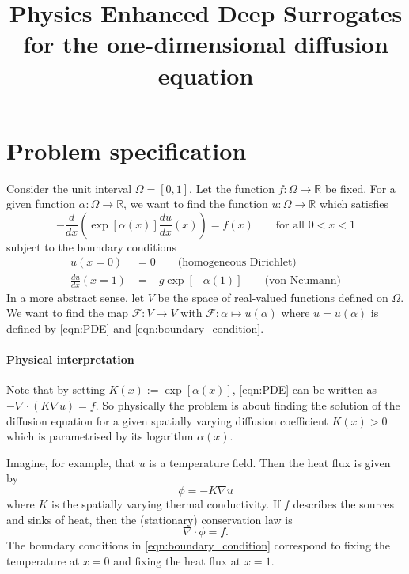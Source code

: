 \documentclass[11pt]{article}
\title{Physics Enhanced Deep Surrogates for the one-dimensional diffusion equation}
\begin{document}
\maketitle
\section{Problem specification}
Consider the unit interval $\Omega=[0,1]$. Let the function $f:\Omega\rightarrow \mathbb{R}$ be fixed. For a given function $\alpha:\Omega\rightarrow \mathbb{R}$, we want to find the function $u:\Omega\rightarrow\mathbb{R}$ which satisfies
\begin{equation}
    -\frac{d}{dx}\left(\exp[\alpha(x)]\frac{du}{dx}(x)\right) = f(x)\qquad\text{for all $0<x<1$}
    \label{eqn:PDE}
\end{equation}
subject to the boundary conditions 
\begin{equation}
    \begin{aligned}
    u(x=0) &=0 \qquad{\text{(homogeneous Dirichlet)}}\\
    \frac{du}{dx}(x=1) &=-g\exp[-\alpha(1)] \qquad{\text{(von Neumann)}}
    \end{aligned}
    \label{eqn:boundary_condition}
\end{equation}
In a more abstract sense, let $V$ be the space of real-valued functions defined on $\Omega$. We want to find the map $\mathcal{F} : V\rightarrow V$ with $\mathcal{F}:\alpha \mapsto u(\alpha)$ where $u=u(\alpha)$ is defined by \eqref{eqn:PDE} and \eqref{eqn:boundary_condition}.
\paragraph{Physical interpretation}
Note that by setting $K(x):=\exp[\alpha(x)]$, \eqref{eqn:PDE} can be written as $-\nabla\cdot (K\nabla u)=f$. So physically the problem is about finding the solution of the diffusion equation for a given spatially varying diffusion coefficient $K(x)>0$ which is parametrised by its logarithm $\alpha(x)$.

Imagine, for example, that $u$ is a temperature field. Then the heat flux is given by
\begin{equation}
    \phi = - K\nabla u
\end{equation}
where $K$ is the spatially varying thermal conductivity. If $f$ describes the sources and sinks of heat, then the (stationary) conservation law is
\begin{equation}
    \nabla \cdot \phi = f.
\end{equation}
The boundary conditions in \eqref{eqn:boundary_condition} correspond to fixing the temperature at $x=0$ and fixing the heat flux at $x=1$.
\end{document}
